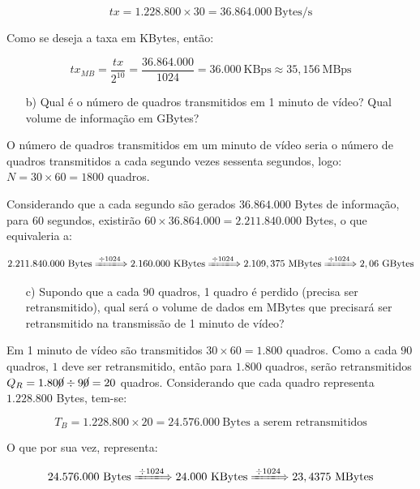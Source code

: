 \documentclass[a4paper,11pt]{article}
\begin{document}
\[
tx = 1.228.800 \times 30 = 36.864.000\ \text{Bytes/s}
\]

Como se deseja a taxa em KBytes, então:

\[
tx_{MB} = \frac{tx}{2^{10}} = \frac{36.864.000}{1024} = 36.000\ \text{KBps}
\approx 35,156\ \text{MBps}
\]

\begin{itemize}
    \item [b)] Qual é o número de quadros transmitidos em 1 minuto de vídeo?
Qual volume de informação em GBytes?
\end{itemize}

O número de quadros transmitidos em um minuto de vídeo seria o número de quadros
transmitidos a cada segundo vezes sessenta segundos, logo: $N = 30 \times 60 =
1800$ quadros.

Considerando que a cada segundo são gerados $36.864.000$ Bytes de informação,
para 60 segundos, existirão $60 \times 36.864.000 = 2.211.840.000$ Bytes, o que
equivaleria a:

\[
2.211.840.000\ \text{Bytes} \xLongrightarrow{\div 1024\ }
2.160.000\ \text{KBytes} \xLongrightarrow{\div 1024\ }
2.109,375\ \text{MBytes} \xLongrightarrow{\div 1024\ }
2,06\ \text{GBytes}
\]

\begin{itemize}
    \item [c)] Supondo que a cada 90 quadros, 1 quadro é perdido (precisa ser
retransmitido), qual será o volume de dados em MBytes que precisará ser
retransmitido na transmissão de 1 minuto de vídeo?
\end{itemize}

Em 1 minuto de vídeo são transmitidos $30 \times 60 = 1.800$ quadros. Como a
cada $90$ quadros, $1$ deve ser retransmitido, então para $1.800$ quadros, serão
retransmitidos $Q_R = 1.80\cancel{0} \div 9\cancel{0} = 20$ quadros.
Considerando que cada quadro representa $1.228.800$ Bytes, tem-se:

\[
T_B = 1.228.800 \times 20 = 24.576.000\ \text{Bytes a serem
retransmitidos}
\]

O que por sua vez, representa:

\[
24.576.000\ \text{Bytes} \xLongrightarrow{\div 1024\ }
24.000\ \text{KBytes} \xLongrightarrow{\div 1024\ }
23,4375\ \text{MBytes}
\]
\end{document}
